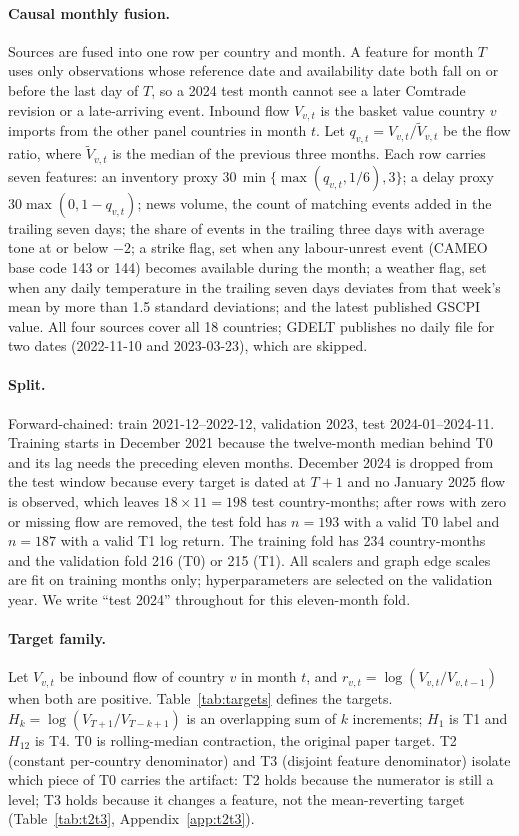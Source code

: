 \documentclass[10pt]{article}
\begin{document}
\paragraph{Causal monthly fusion.}
Sources are fused into one row per country and month. A feature for month $T$ uses only observations whose reference date and availability date both fall on or before the last day of $T$, so a 2024 test month cannot see a later Comtrade revision or a late-arriving event. Inbound flow $V_{v,t}$ is the basket value country $v$ imports from the other panel countries in month $t$. Let $q_{v,t}=V_{v,t}/\tilde V_{v,t}$ be the flow ratio, where $\tilde V_{v,t}$ is the median of the previous three months. Each row carries seven features: an inventory proxy $30\,\min\{\max(q_{v,t},1/6),3\}$; a delay proxy $30\max(0,1-q_{v,t})$; news volume, the count of matching events added in the trailing seven days; the share of events in the trailing three days with average tone at or below $-2$; a strike flag, set when any labour-unrest event (CAMEO base code 143 or 144) becomes available during the month; a weather flag, set when any daily temperature in the trailing seven days deviates from that week's mean by more than 1.5 standard deviations; and the latest published GSCPI value. All four sources cover all 18 countries; GDELT publishes no daily file for two dates (2022-11-10 and 2023-03-23), which are skipped.
\paragraph{Split.}
Forward-chained: train 2021-12--2022-12, validation 2023, test 2024-01--2024-11. Training starts in December 2021 because the twelve-month median behind T0 and its lag needs the preceding eleven months. December 2024 is dropped from the test window because every target is dated at $T+1$ and no January 2025 flow is observed, which leaves $18\times11=198$ test country-months; after rows with zero or missing flow are removed, the test fold has $n=193$ with a valid T0 label and $n=187$ with a valid T1 log return. The training fold has 234 country-months and the validation fold 216 (T0) or 215 (T1). All scalers and graph edge scales are fit on training months only; hyperparameters are selected on the validation year. We write ``test 2024'' throughout for this eleven-month fold.

\paragraph{Target family.}
Let $V_{v,t}$ be inbound flow of country $v$ in month $t$, and $r_{v,t}=\log(V_{v,t}/V_{v,t-1})$ when both are positive. Table~\ref{tab:targets} defines the targets. $H_k=\log(V_{T+1}/V_{T-k+1})$ is an overlapping sum of $k$ increments; $H_1$ is T1 and $H_{12}$ is T4. T0 is rolling-median contraction, the original paper target. T2 (constant per-country denominator) and T3 (disjoint feature denominator) isolate which piece of T0 carries the artifact: T2 holds because the numerator is still a level; T3 holds because it changes a feature, not the mean-reverting target (Table~\ref{tab:t2t3}, Appendix~\ref{app:t2t3}).
\end{document}
